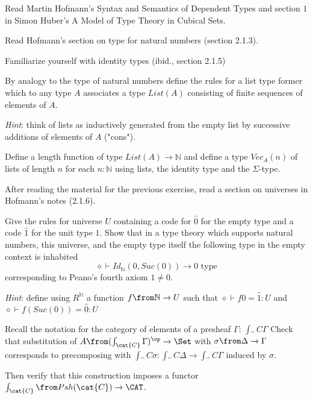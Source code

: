\def\pathToRoot{../../}



\author{Nikita Ziuzin}

\begin{hint}
  Read Martin Hofmann's Syntax and Semantics of Dependent Types and section $1$
  in Simon Huber's A Model of Type Theory in Cubical Sets.
\end{hint}

\begin{exercise}
  Read Hofmann's section on type for natural numbers (section 2.1.3).

  Familiarize yourself with identity types (ibid., section 2.1.5)

  By analogy to the type of natural numbers define the rules for a list type
  former which to any type $A$ associates a type $List(A)$ consisting of finite
  sequences of elements of $A$.

  \emph{Hint}: think of lists as inductively
  generated from the empty list by successive additions of elements of $A$
  ("cons").

  Define a length function of type $List(A) \to \mathbb{N}$ and
  define a type $Vec_A(n)$ of lists of length $n$ for each $n : \mathbb{N}$
  using lists, the identity type and the $\Sigma$-type.
\end{exercise}

\begin{exercise}
  After reading the material for the previous exercise, read a section on
  universes in Hofmann's notes (2.1.6).

  Give the rules for universe $U$ containing a code for $\hat{0}$ for the empty
  type and a code $\hat{1}$ for the unit type $1$. Show that in a type theory
  which supports natural numbers, this universe, and the empty type itself the
  following type in the empty context is inhabited
  \[
    \diamond \vdash Id_\mathbb{N}(0, Suc(0)) \to 0 \text{ type}
  \]
  corresponding to Peano's fourth axiom $1 \neq 0$.

  \emph{Hint}: define using $R^\mathbb{N}$ a function $f \from \mathbb{N} \to
  U$ such that $\diamond \vdash f 0 = \hat{1}: U$ and $\diamond \vdash
  f(Suc(0)) = \hat{0} : U$
\end{exercise}

\begin{exercise}
  Recall the notation for the category of elements of a presheaf $\Gamma$:
  $\int_\cat{C}\Gamma$ Check that substitution of $A\from
  (\int_\cat{C}\Gamma)^\op \to \Set$ with $\sigma \from \Delta \to \Gamma$
  corresponds to precomposing with $\int_\cat{C} \sigma : \int_\cat{C} \Delta
  \to \int_\cat{C} \Gamma$ induced by $\sigma$.

  Then verify that this construction imposes a functor $\int_\cat{C} \from
  Psh(\cat{C}) \to \CAT$.
\end{exercise}
\begin{answer}
\end{answer}

